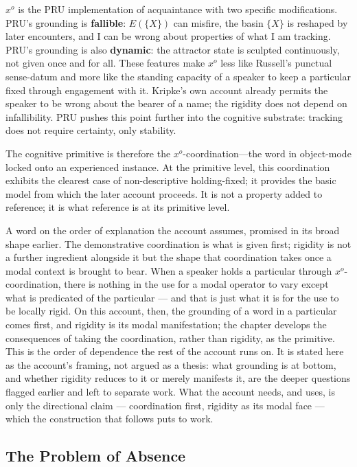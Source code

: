 \documentclass[12pt,a4paper]{article}
\begin{document}
\(x^o\) is the PRU implementation of acquaintance with two specific modifications. PRU's grounding is \textbf{fallible}: \(E(\{X\})\) can misfire, the basin \(\{X\}\) is reshaped by later encounters, and I can be wrong about properties of what I am tracking. PRU's grounding is also \textbf{dynamic}: the attractor state is sculpted continuously, not given once and for all. These features make \(x^o\) less like Russell's punctual sense-datum and more like the standing capacity of a speaker to keep a particular fixed through engagement with it. Kripke's own account already permits the speaker to be wrong about the bearer of a name; the rigidity does not depend on infallibility. PRU pushes this point further into the cognitive substrate: tracking does not require certainty, only stability.

The cognitive primitive is therefore the \(x^o\)-coordination---the word in object-mode locked onto an experienced instance. At the primitive level, this coordination exhibits the clearest case of non-descriptive holding-fixed; it provides the basic model from which the later account proceeds. It is not a property added to reference; it is what reference is at its primitive level.

A word on the order of explanation the account assumes, promised in its broad shape earlier. The demonstrative coordination is what is given first; rigidity is not a further ingredient alongside it but the shape that coordination takes once a modal context is brought to bear. When a speaker holds a particular through \(x^o\)-coordination, there is nothing in the use for a modal operator to vary except what is predicated of the particular --- and that is just what it is for the use to be locally rigid. On this account, then, the grounding of a word in a particular comes first, and rigidity is its modal manifestation; the chapter develops the consequences of taking the coordination, rather than rigidity, as the primitive. This is the order of dependence the rest of the account runs on. It is stated here as the account's framing, not argued as a thesis: what grounding is at bottom, and whether rigidity reduces to it or merely manifests it, are the deeper questions flagged earlier and left to separate work. What the account needs, and uses, is only the directional claim --- coordination first, rigidity as its modal face --- which the construction that follows puts to work.

\subsection{The Problem of Absence}\label{the-problem-of-absence}
\end{document}
